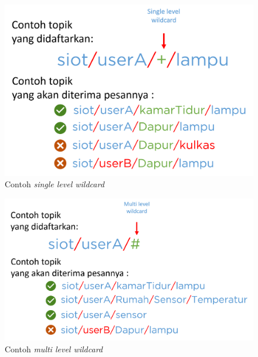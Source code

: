 \begin{figure}
	\centering
	\includegraphics[width=.9\textwidth]{pics/single-level-wildcard.PNG}
	\caption{Contoh \textit{single level wildcard} \cite{hiveMQtopic}}
	\label{fig:mqtt-single-level-wildcard}
\end{figure}

\begin{figure}
	\centering
	\includegraphics[width=.9\textwidth]{pics/multi-level-wildcard.PNG}
	\caption{Contoh \textit{multi level wildcard} \cite{hiveMQtopic}}
	\label{fig:mqtt-multi-level-wildcard}
\end{figure}
